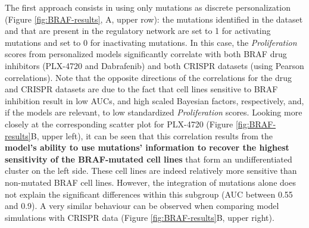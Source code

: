 \documentclass[a4paper,12pt,twoside,onecolumn,openright,final,oldfontcommands]{memoir}
\begin{document}
The first approach consists in using only mutations as discrete
personalization (Figure \ref{fig:BRAF-results}, A, upper row): the
mutations identified in the dataset and that are present in the
regulatory network are set to 1 for activating mutations and set to 0
for inactivating mutations. In this case, the \emph{Proliferation}
scores from personalized models significantly correlate with both BRAF
drug inhibitors (PLX-4720 and Dabrafenib) and both CRISPR datasets
(using Pearson correlations). Note that the opposite directions of the
correlations for the drug and CRISPR datasets are due to the fact that
cell lines sensitive to BRAF inhibition result in low AUCs, and high
scaled Bayesian factors, respectively, and, if the models are relevant,
to low standardized \emph{Proliferation} scores. Looking more closely at
the corresponding scatter plot for PLX-4720 (Figure
\ref{fig:BRAF-results}B, upper left), it can be seen that this
correlation results from the \textbf{model's ability to use mutations'
information to recover the highest sensitivity of the BRAF-mutated cell
lines} that form an undifferentiated cluster on the left side. These
cell lines are indeed relatively more sensitive than non-mutated BRAF
cell lines. However, the integration of mutations alone does not explain
the significant differences within this subgroup (AUC between 0.55 and
0.9). A very similar behaviour can be observed when comparing model
simulations with CRISPR data (Figure \ref{fig:BRAF-results}B, upper
right).
\end{document}
